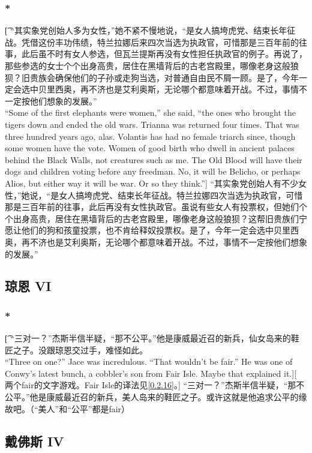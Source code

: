 \documentclass[12pt,a4paper]{article}
\begin{document}
\subsubsection{\color{red}*}\t[	
	“其实象党创始人多为女性，”她不紧不慢地说，“是女人搞垮虎党、结束长年征战。凭借这份丰功伟绩，特兰拉娜后来四次当选为执政官，可惜那是三百年前的往事，此后虽不时有女人参选，但瓦兰提斯再没有女性担任执政官的例子。再说了，那些参选的女士个个出身高贵，居住在黑墙背后的古老宫殿里，哪像老身这般狼狈？旧贵族会确保他们的子孙或走狗当选，对普通自由民不屑一顾。是了，今年一定会选中贝里西奥，再不济也是艾利奥斯，无论哪个都意味着开战。不过，事情不一定按他们想象的发展。”\\
	“Some of the first elephants were women,” she said, “the ones who brought the tigers down and ended the old wars. Trianna was returned four times. That was three hundred years ago, alas. Volantis has had no female triarch since, though some women have the vote. Women of good birth who dwell in ancient palaces behind the Black Walls, not creatures such as me. The Old Blood will have their dogs and children voting before any freedman. No, it will be Belicho, or perhaps Alios, but either way it will be war. Or so they think.”]
	“其实象党创始人有不少女性，”她说，“是女人搞垮虎党、结束长年征战。特兰拉娜四次当选为执政官，可惜那是三百年前的往事，此后再没有女性执政官。虽说有些女人有投票权，但她们个个出身高贵，居住在黑墙背后的古老宫殿里，哪像老身这般狼狈？这帮旧贵族们宁愿让他们的狗和孩童投票，也不肯给释奴投票权。是了，今年一定会选中贝里西奥，再不济也是艾利奥斯，无论哪个都意味着开战。不过，事情不一定按他们想象的发展。”
	
\subsection{琼恩 VI}
\subsubsection{\color{red}*}\t[
	“三对一？”杰斯半信半疑，“那不公平。”他是康威最近召的新兵，仙女岛来的鞋匠之子。没跟琼恩交过手，难怪如此。\\
	“Three on one?” Jace was incredulous. “That wouldn't be fair.” He was one of Conwy's latest bunch, a cobbler's son from Fair Isle. Maybe that explained it.][
	两个fair的文字游戏。Fair Isle的译法见\ref{0.2.16}。]
	“三对一？”杰斯半信半疑，“那不公平。”他是康威最近召的新兵，美人岛来的鞋匠之子。或许这就是他追求公平的缘故吧。（“美人”和“公平”都是fair）
	
\subsection{戴佛斯 IV}
\end{document}
